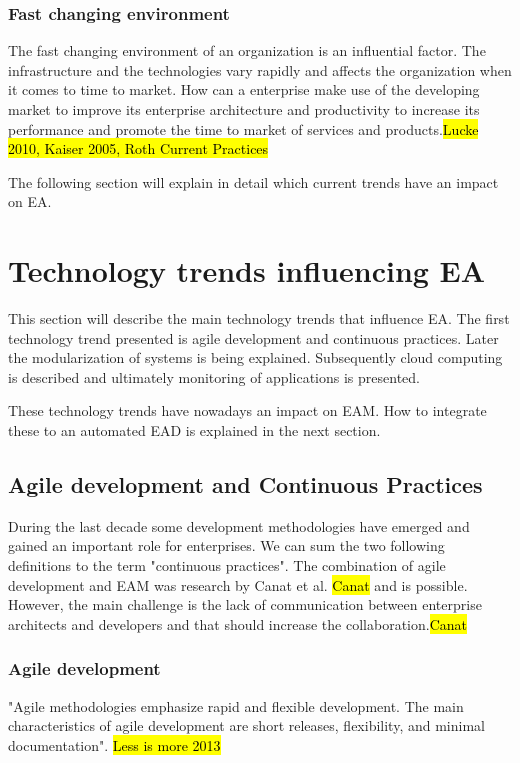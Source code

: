 \subsubsection{Fast changing environment}
The fast changing environment of an organization is an influential factor. The infrastructure and the technologies vary rapidly and affects the organization when it comes to time to market. How can a enterprise make use of the developing market to improve its enterprise architecture and productivity to increase its performance and promote the time to market of services and products.\hl{Lucke 2010, Kaiser 2005, Roth Current Practices}


The following section will explain in detail which current trends have an impact on EA.


\section{Technology trends influencing EA}

This section will describe the main technology trends that influence EA. The first technology trend presented is agile development and continuous practices. Later the modularization of systems is being explained. Subsequently cloud computing is described and ultimately monitoring of applications is presented.

These technology trends have nowadays an impact on EAM. How to integrate these to an automated EAD is explained in the next section. 

\subsection{Agile development and Continuous Practices}

During the last decade some development methodologies have emerged and gained an important role for enterprises. We can sum the two following definitions to the term "continuous practices". The combination of agile development and EAM was research by Canat et al. \hl{Canat} and is possible. However, the main challenge is the lack of communication between enterprise architects and developers and that should increase the collaboration.\hl{Canat}

\subsubsection{Agile development}
"Agile methodologies emphasize rapid and flexible development. The main characteristics of agile development are short releases, flexibility, and minimal documentation". \hl{Less is more 2013}

